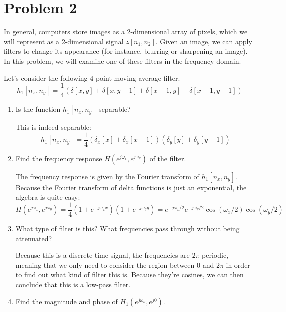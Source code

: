 \documentclass[10pt]{article}
\begin{document}
	\section*{Problem 2}
	In general, computers store images as a 2-dimensional array of pixels, which we will represent as a 2-dimensional
	signal \( z[n_1, n_2 ] \). Given an image, we can apply filters to change its appearance (for instance, blurring 
	or sharpening an image). In this problem, we will examine one of these filters in the frequency domain. 

	Let's consider the following 4-point moving average filter. 
	\[
		h_1[n_x, n_y] = \frac{1}{4}(\delta[x,y] + \delta[x, y-1] + \delta[x - 1, y] + \delta[x-1, y-1])
	\] 
	\begin{enumerate}[label=\alph*)]
		\item Is the function \( h_1[n_x, n_y] \) separable?

			\begin{solution}
				This is indeed separable:
				\[
					h_1[n_x, n_y] = \frac{1}{4}(\delta_x[x] + \delta_x[x - 1])(\delta_y[y] + \delta_y[y-1])
				\] 
			\end{solution}
		\item Find the frequency response \( H(e^{j \omega_x}, e^{j \omega_y}) \) of the filter. 

			\begin{solution}
				The frequency response is given by the Fourier transform of \( h_1[n_x, n_y] \). Because the 
				Fourier transform of delta functions is just an exponential, the algebra is quite easy:
				\[
				H(e^{j \omega_x}, e^{j \omega_y}) = \frac{1}{4}(1 + e^{-j \omega_x x})(1 + e^{-j \omega_y y})
				= e^{-j \omega_x / 2} e^{-j \omega_y / 2} \cos(\omega_x / 2)\cos(\omega_y / 2)
				\] 
			\end{solution}
		\item What type of filter is this? What frequencies pass through without being 
			attenuated?

			\begin{solution}
				Because this is a discrete-time signal, the frequencies are \( 2\pi \)-periodic, meaning that 
				we only need to consider the region between \( 0 \) and \( 2\pi \) in order to find out what kind of 
				filter this is. Because they're cosines, we can then conclude that 
				this is a low-pass filter. 
			\end{solution}
		\item Find the magnitude and phase of \( H_1(e^{j \omega_x}, e^{j0}) \). 


\end{enumerate}
\end{document}
